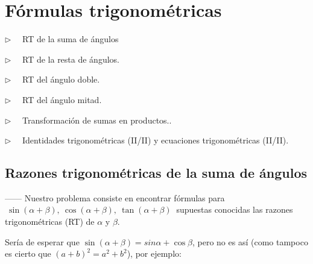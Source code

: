 
\chapter{Fórmulas trigonométricas}

\vspace{10mm}


\begin{adjustwidth}{40pt}{40pt}
\begin{cuadro-gris}

	\begin{multicols}{2}
	$\triangleright \quad$  RT de la suma de ángulos
	
	$\triangleright \quad$  RT de la resta de ángulos.
	
	$\triangleright \quad$  RT del ángulo doble.
	
	$\triangleright \quad$  RT del ángulo mitad.
	
	$\triangleright \quad$  Transformación de sumas en productos..
	
	$\triangleright \quad$  Identidades trigonométricas  (II/II) y ecuaciones trigonométricas (II/II).
	\end{multicols}
	
\end{cuadro-gris}
\end{adjustwidth}



\vspace{5mm}
\section{Razones trigonométricas de la suma de ángulos}
\vspace{1cm}

------ Nuestro problema consiste en encontrar fórmulas para $\ \sin (\alpha+\beta),\ \cos (\alpha+\beta),\ \tan(\alpha+\beta)\ $ supuestas conocidas las razones trigonométricas (RT) de $\alpha$ y $\beta$.

Sería de esperar que $\sin (\alpha+\beta)=sin \alpha+\cos \beta $, 
pero no es así \textcolor{gris}{(como tampoco es cierto que $(a+b)^2=a^2+b^2$)}, por ejemplo:

